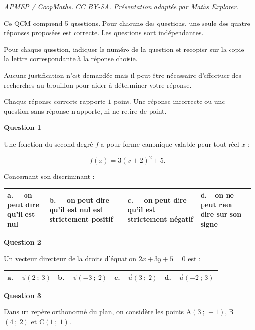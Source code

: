\documentclass[10pt]{article}
\providecommand{\vect}[1]{\overrightarrow{#1}}
\begin{document}
\noindent\textit{APMEP / CoopMaths. CC BY-SA. Présentation adaptée par Maths Explorer.}\par\medskip
\medskip

Ce QCM comprend 5 questions. Pour chacune des questions, une seule des quatre réponses proposées est correcte. Les questions sont indépendantes.

Pour chaque question, indiquer le numéro de la question et recopier sur la copie la lettre correspondante à la réponse choisie.

Aucune justification n'est demandée mais il peut être nécessaire d'effectuer des recherches au brouillon pour aider à déterminer votre réponse.

Chaque réponse correcte rapporte $1$ point. Une réponse incorrecte ou une question sans réponse n'apporte, ni ne retire de point.

\medskip

\textbf{Question 1}

Une fonction du second degré $f$ a pour forme canonique valable pour tout réel $x$ :

\[f(x) = 3(x + 2)^2 + 5.\]

Concernant son discriminant :

\begin{center}
\begin{tabularx}{\linewidth}{|*{4}{X|}}\hline
\textbf{a.~~} on peut dire qu'il est nul&\textbf{b.~~} on peut dire qu'il est nul est strictement
positif&\textbf{c.~~} on peut dire qu'il est strictement négatif&\textbf{d.~~}on ne peut rien dire sur son signe\\ \hline
\end{tabularx}
\end{center}

\textbf{Question 2}

Un vecteur directeur de la droite d'équation $2x + 3y + 5 = 0$ est : 

\begin{center}
\begin{tabularx}{\linewidth}{|*{4}{X|}}\hline
\textbf{a.~~}$\vect{u}(2~;~3)$&\textbf{b.~~}$\vect{u}(-3~;~2)$ &\textbf{c.~~}$\vect{u}(3~;~2)$&\textbf{d.~~}$\vect{u}(- 2~;~3)$\rule[-3mm]{0mm}{8mm}\\ \hline
\end{tabularx}
\end{center}

\textbf{Question 3}

Dans un repère orthonormé du plan, on considère les points A$(3~;~-1)$, B$(4~;~2)$ et C$(1~;~1)$.
\end{document}
